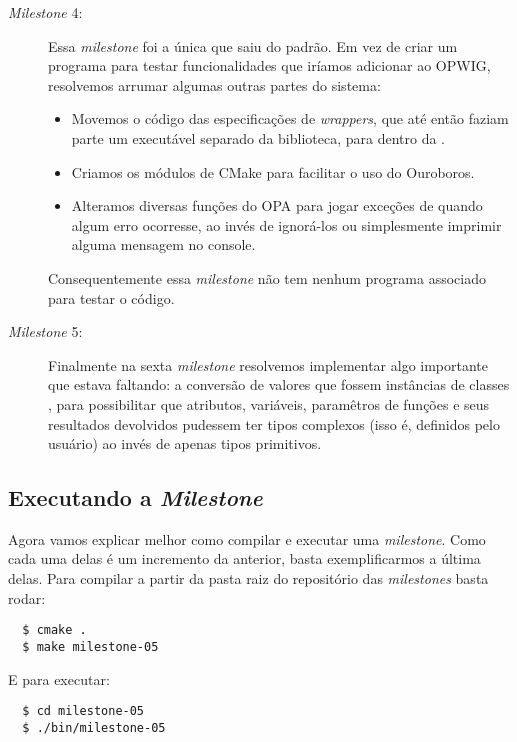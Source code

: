 \begin{description}
  \item[\textit{Milestone} 4:] Essa \textit{milestone} foi a única que saiu do padrão.
    Em vez de criar um programa para testar funcionalidades que iríamos adicionar
    ao OPWIG, resolvemos arrumar algumas outras partes do sistema:
    \begin{itemize}
      \item Movemos o código das especificações de \textit{wrappers}, que até então
        faziam parte um executável separado da biblioteca, para dentro da
        .
      \item Criamos os módulos de CMake para facilitar o uso do Ouroboros.
      \item Alteramos diversas funções do OPA para jogar exceções de \CXX{} quando algum erro
        ocorresse, ao invés de ignorá-los ou simplesmente imprimir alguma mensagem no console.
    \end{itemize}
    Consequentemente essa \textit{milestone} não tem nenhum programa associado para testar o
    código.
    
  \item[\textit{Milestone} 5:] Finalmente na sexta \textit{milestone} resolvemos implementar algo
    importante que estava faltando: a conversão de valores que fossem instâncias de classes
    \CXX{}, para possibilitar que atributos, variáveis, paramêtros de funções e seus resultados
    devolvidos pudessem ter tipos complexos (isso é, definidos pelo usuário) ao invés
    de apenas tipos primitivos.
    
\end{description}

\subsection{Executando a \textit{Milestone}}
Agora vamos explicar melhor como compilar e executar uma \textit{milestone}. Como cada 
uma delas é um incremento da anterior, basta exemplificarmos a última delas. Para compilar
a partir da pasta raiz do repositório das \textit{milestones} basta rodar:

\begin{verbatim}
  $ cmake .
  $ make milestone-05
\end{verbatim}

E para executar:

\begin{verbatim}
  $ cd milestone-05
  $ ./bin/milestone-05
\end{verbatim}

